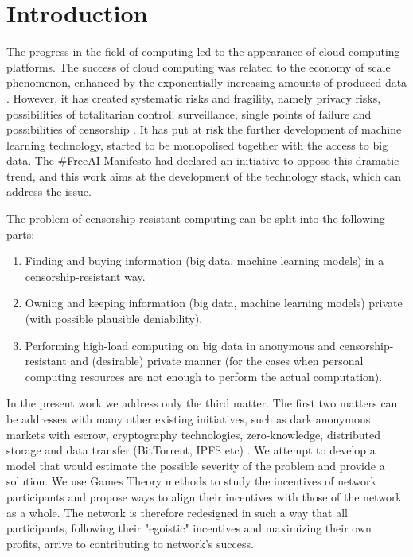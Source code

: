 \documentclass[conference]{IEEEtran}
\providecommand{\tightlist}{%
  \setlength{\itemsep}{0pt}%
  \setlength{\parskip}{0pt}%
  \setlength{\topsep}{0pt}}
\begin{document}
\section{Introduction}

The progress in the field of computing led to the appearance of cloud computing platforms. The success of cloud computing was related to the economy of scale phenomenon, enhanced by the exponentially increasing amounts of produced data \cite{cloudcomputing}. However, it has created systematic risks and fragility, namely privacy risks, possibilities of totalitarian control, surveillance, single points of failure and possibilities of censorship \cite{cc-censorship2, cc-censorship1}. It has put at risk the further development of machine learning technology, started to be monopolised together with the access to big data. \href{https://manifesto.ai}{The \#FreeAI Manifesto} \cite{freeai} had declared an initiative to oppose this dramatic trend, and this work aims at the development of the technology stack, which can address the issue.

The problem of censorship-resistant computing can be split into the following parts:
\begin{enumerate}[topsep=0pt]
\tightlist
    \item 
        Finding and buying information (big data, machine learning models) in a censorship-resistant way.
    \item
        Owning and keeping information (big data, machine learning models) private (with possible plausible deniability).
    \item
        Performing high-load computing on big data in anonymous and censorship-resistant and (desirable) private manner (for the cases when personal computing resources are not enough to perform the actual computation).
\end{enumerate}

In the present work we address only the third matter. The first two matters can be addresses with many other existing initiatives, such as dark anonymous markets with escrow, cryptography technologies, zero-knowledge, distributed storage and data transfer (BitTorrent, IPFS etc) \cite{ipfs, bittorrent, afs, tor, gnunet}. We attempt to develop a model that would estimate the possible severity of the problem and provide a solution. We use Games Theory methods to study the incentives of network participants and propose ways to align their incentives with those of the network as a whole. The network is therefore redesigned in such a way that all participants, following their "egoistic" incentives and maximizing their own profits, arrive to contributing to network's success.
\end{document}
